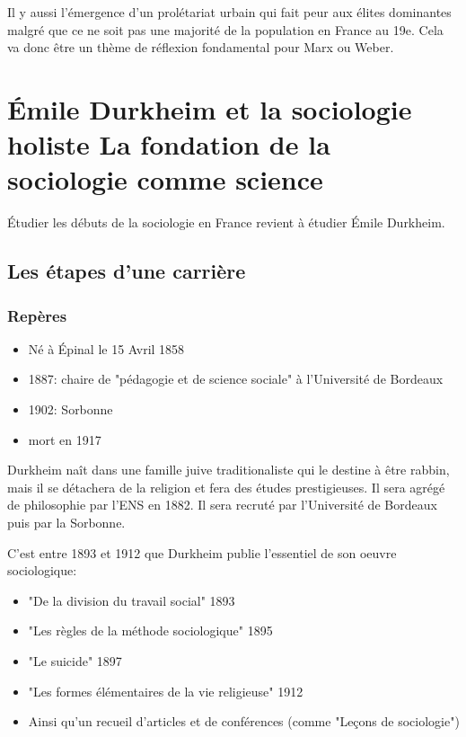 \documentclass[10pt, a4paper, openany]{book}
\begin{document}
Il y aussi l'émergence d'un prolétariat urbain qui fait peur aux élites dominantes malgré que ce ne soit pas une majorité de la population en France au 19e. Cela va donc être un thème de réflexion fondamental pour Marx ou Weber. 

\chapter{Émile Durkheim et la sociologie holiste \newline La fondation de la sociologie comme science}

Étudier les débuts de la sociologie en France revient à étudier Émile Durkheim.

\section{Les étapes d'une carrière}

\subsection{Repères}
\begin{itemize}
\item Né à Épinal le 15 Avril 1858
\item 1887: chaire de "pédagogie et de science sociale" à l'Université de Bordeaux
\item 1902: Sorbonne
\item mort en 1917
\end{itemize}

Durkheim naît dans une famille juive traditionaliste qui le destine à être rabbin, mais il se détachera de la religion et fera des études prestigieuses. Il sera agrégé de philosophie par l'ENS en 1882. Il sera recruté par l'Université de Bordeaux puis par la Sorbonne.

C'est entre 1893 et 1912 que Durkheim publie l'essentiel de son oeuvre sociologique:
\begin{itemize}
\item "De la division du travail social" 1893
\item "Les règles de la méthode sociologique" 1895
\item "Le suicide" 1897
\item "Les formes élémentaires de la vie religieuse" 1912
\item Ainsi qu'un recueil d'articles et de conférences (comme "Leçons de sociologie")
\end{itemize}
\end{document}
